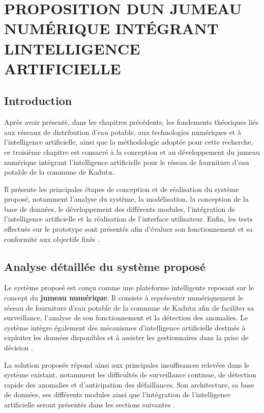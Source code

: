 \chapter{PROPOSITION D\textquotesingle UN JUMEAU NUMÉRIQUE INTÉGRANT L\textquotesingle INTELLIGENCE ARTIFICIELLE}

\section{Introduction}

Après avoir présenté, dans les chapitres précédents, les fondements
théoriques liés aux réseaux de distribution d'eau potable, aux
technologies numériques et à l'intelligence artificielle, ainsi que la
méthodologie adoptée pour cette recherche, ce troisième chapitre est
consacré à la conception et au développement du jumeau numérique
intégrant l'intelligence artificielle pour le réseau de fourniture
d'eau potable de la commune de Kadutu.

Il présente les principales étapes de conception et de réalisation du
système proposé, notamment l'analyse du système, la modélisation, la
conception de la base de données, le développement des différents
modules, l'intégration de l'intelligence artificielle et la réalisation
de l'interface utilisateur. Enfin, les tests effectués sur le prototype
sont présentés afin d'évaluer son fonctionnement et sa conformité aux
objectifs fixés \cite{ref106}.

\section{Analyse détaillée du système proposé}
\label{analyse-duxe9tailluxe9e-du-systuxe8me-proposuxe9}

Le système proposé est conçu comme une plateforme intelligente reposant
sur le concept du \textbf{jumeau numérique}. Il consiste à représenter
numériquement le réseau de fourniture d'eau potable de la commune de
Kadutu afin de faciliter sa surveillance, l'analyse de son fonctionnement
et la détection des anomalies. Le système intègre également des
mécanismes d'intelligence artificielle destinés à exploiter les données
disponibles et à assister les gestionnaires dans la prise de décision
\cite{ref17}.

La solution proposée répond ainsi aux principales insuffisances relevées
dans le système existant, notamment les difficultés de surveillance
continue, de détection rapide des anomalies et d'anticipation des
défaillances. Son architecture, sa base de données, ses différents
modules ainsi que l'intégration de l'intelligence artificielle seront
présentés dans les sections suivantes \cite{ref20}.

